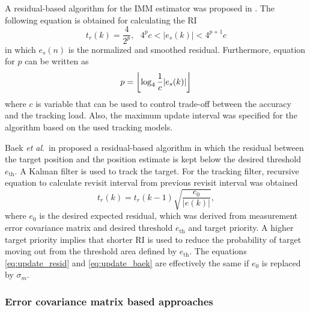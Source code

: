 \documentclass[english, 12pt, a4paper, elec, utf8, a-1b, online]{aaltothesis}
\newcommand{\etal}{\textit{et al}.~}
\DeclarePairedDelimiter\floor{\lfloor}{\rfloor}
\begin{document}
A residual-based algorithm for the IMM estimator was proposed in \cite{ChengTing2007}.
The following equation is obtained for calculating the RI
\begin{equation}
    t_r(k) = \frac{4}{2^p}, \text{ } 4^p c < |e_s(k)| < 4^{p+1}c
\end{equation}
in which $e_s(n)$ is the normalized and smoothed residual.
Furthermore, equation for $p$ can be written as
\begin{equation}
    p = \floor*{\log_4\frac{1}{c}|e_s(k)|}
\end{equation}
where $c$ is variable that can be used to control trade-off between the accuracy and the tracking load.
Also, the maximum update interval was specified for the algorithm based on the used tracking models.

Baek \etal in \cite{Baek2010} proposed a residual-based algorithm in which the residual between the target position and the position estimate is kept below the desired threshold $e_\text{th}$.
A Kalman filter is used to track the target.
For the tracking filter, recursive equation to calculate revisit interval from previous revisit interval was obtained
\begin{equation}\label{eq:update_baek}
    t_r(k) = t_r(k - 1) \sqrt{\frac{e_0}{|e(k)|}},
\end{equation}
where $e_0$ is the desired expected residual, which was derived from measurement error covariance matrix and desired threshold $e_\text{th}$ and target priority.
A higher target priority implies that shorter RI is used to reduce the probability of target moving out from the threshold area defined by $e_\text{th}$.
The equations \eqref{eq:update_resid} and \eqref{eq:update_baek} are effectively the same if $e_0$ is replaced by $\sigma_m$.


\subsubsection{Error covariance matrix based approaches}
\end{document}
